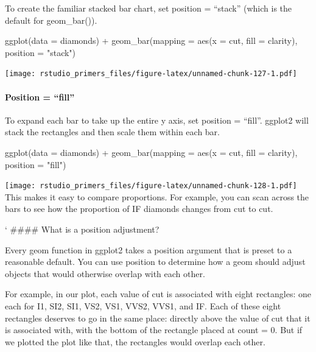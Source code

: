 \documentclass[
]{article}
\newenvironment{Shaded}{\begin{snugshade}}{\end{snugshade}}
\newcommand{\AttributeTok}[1]{\textcolor[rgb]{0.77,0.63,0.00}{#1}}
\newcommand{\FunctionTok}[1]{\textcolor[rgb]{0.00,0.00,0.00}{#1}}
\newcommand{\NormalTok}[1]{#1}
\newcommand{\SpecialCharTok}[1]{\textcolor[rgb]{0.00,0.00,0.00}{#1}}
\newcommand{\StringTok}[1]{\textcolor[rgb]{0.31,0.60,0.02}{#1}}
\begin{document}
To create the familiar stacked bar chart, set position = ``stack''
(which is the default for geom\_bar()).

\begin{Shaded}
\begin{Highlighting}[]
\FunctionTok{ggplot}\NormalTok{(}\AttributeTok{data =}\NormalTok{ diamonds) }\SpecialCharTok{+}
  \FunctionTok{geom\_bar}\NormalTok{(}\AttributeTok{mapping =} \FunctionTok{aes}\NormalTok{(}\AttributeTok{x =}\NormalTok{ cut, }\AttributeTok{fill =}\NormalTok{ clarity), }\AttributeTok{position =} \StringTok{"stack"}\NormalTok{)}
\end{Highlighting}
\end{Shaded}

\texttt{[image: rstudio\_primers\_files/figure-latex/unnamed-chunk-127-1.pdf]}

\hypertarget{position-fill}{%
\paragraph{Position = ``fill''}\label{position-fill}}

To expand each bar to take up the entire y axis, set position =
``fill''. ggplot2 will stack the rectangles and then scale them within
each bar.

\begin{Shaded}
\begin{Highlighting}[]
\FunctionTok{ggplot}\NormalTok{(}\AttributeTok{data =}\NormalTok{ diamonds) }\SpecialCharTok{+}
  \FunctionTok{geom\_bar}\NormalTok{(}\AttributeTok{mapping =} \FunctionTok{aes}\NormalTok{(}\AttributeTok{x =}\NormalTok{ cut, }\AttributeTok{fill =}\NormalTok{ clarity), }\AttributeTok{position =} \StringTok{"fill"}\NormalTok{)}
\end{Highlighting}
\end{Shaded}

\texttt{[image: rstudio\_primers\_files/figure-latex/unnamed-chunk-128-1.pdf]}
This makes it easy to compare proportions. For example, you can scan
across the bars to see how the proportion of IF diamonds changes from
cut to cut.

` \#\#\#\# What is a position adjustment?

Every geom function in ggplot2 takes a position argument that is preset
to a reasonable default. You can use position to determine how a geom
should adjust objects that would otherwise overlap with each other.

For example, in our plot, each value of cut is associated with eight
rectangles: one each for I1, SI2, SI1, VS2, VS1, VVS2, VVS1, and IF.
Each of these eight rectangles deserves to go in the same place:
directly above the value of cut that it is associated with, with the
bottom of the rectangle placed at count = 0. But if we plotted the plot
like that, the rectangles would overlap each other.
\end{document}
